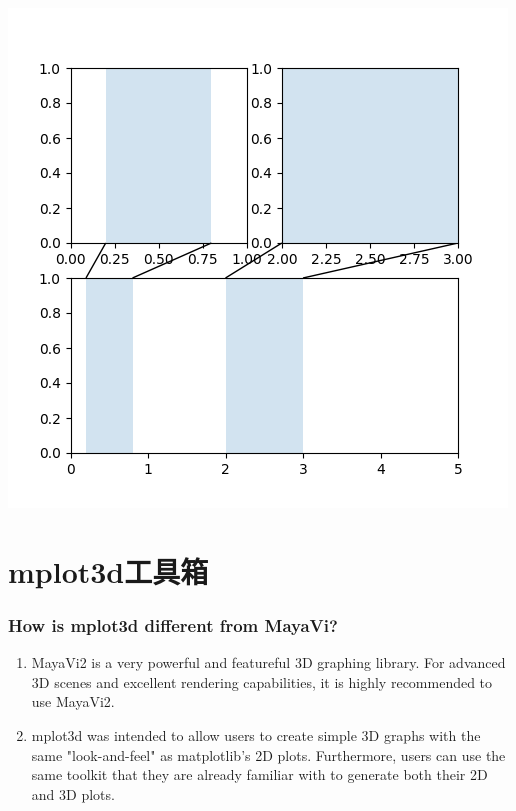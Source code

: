 \documentclass[UTF8,a4paper,12pt]{ctexart}  %
\providecommand{\tightlist}{\setlength{\itemsep}{0pt}\setlength{\parskip}{0pt}}
\begin{document}
\includegraphics{images/axes_zoom_effect.png}

\hypertarget{mplot3dux5de5ux5177ux7bb1}{%
\section{mplot3d工具箱}\label{mplot3dux5de5ux5177ux7bb1}}

\hypertarget{how-is-mplot3d-different-from-mayavi}{%
\subsubsection{How is mplot3d different from MayaVi?}\label{how-is-mplot3d-different-from-mayavi}}

\begin{enumerate}
\def\labelenumi{\arabic{enumi}.}
\tightlist
\item
  MayaVi2 is a very powerful and featureful 3D graphing library. For
  advanced 3D scenes and excellent rendering capabilities, it is
  highly recommended to use MayaVi2.
\item
  mplot3d was intended to allow users to create simple 3D graphs with
  the same "look-and-feel" as matplotlib's 2D plots. Furthermore,
  users can use the same toolkit that they are already familiar with
  to generate both their 2D and 3D plots.
\end{enumerate}
\end{document}
